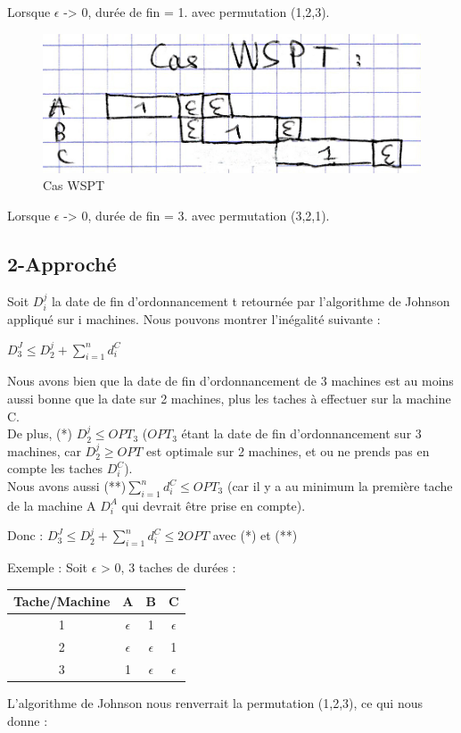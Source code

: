 \documentclass[12pt]{article}
\begin{document}
Lorsque $\epsilon$ -> 0, durée de fin = 1. avec permutation (1,2,3).

\begin{figure}[!ht]
\centering
\centerline{\includegraphics[scale=1]{2.jpg}}
\caption{Cas WSPT}
\label{wspt1}
\end{figure}

Lorsque $\epsilon$ -> 0, durée de fin = 3. avec permutation (3,2,1).

\subsection{2-Approché}

Soit $D_i^j$ la date de fin d'ordonnancement t retournée par l'algorithme de Johnson appliqué sur i machines.
Nous pouvons montrer l'inégalité suivante : \\
\begin{center}
$D_3^J \le D_2^j + \displaystyle\sum_{i=1}^n d_i^C$\\
\end{center}
Nous avons bien que la date de fin d'ordonnancement de 3 machines est au moins aussi bonne que la date sur 2 machines, plus les taches à effectuer sur la machine C.\\

De plus, (*) $D_2^j \le OPT_3$ ($OPT_3$ étant la date de fin d'ordonnancement sur 3 machines, car $D_2^j \ge OPT$ est optimale sur 2 machines, et ou ne prends pas en compte les taches $D_i^C$).\\

Nous avons aussi (**)$\displaystyle\sum_{i=1}^n d_i^C \le OPT_3$ (car il y a au minimum la première tache de la machine A $D_i^A$ qui devrait être prise en compte).\\
\begin{center}
Donc :
$D_3^J \le D_2^j + \displaystyle\sum_{i=1}^n d_i^C \le 2OPT$ avec (*) et (**)
\end{center}
Exemple : Soit $\epsilon$ > 0, 3 taches de durées :\\
\begin{center}
\begin{tabular}{|c|c|c|c|}

\hline 
Tache/Machine & A & B & C \\ 
\hline 
1 & $\epsilon$ & 1 & $\epsilon$ \\ 
\hline 
2 & $\epsilon$ & $\epsilon$ & 1 \\ 
\hline 
3 & 1 & $\epsilon$ & $\epsilon$ \\ 
\hline 
\end{tabular} 
\end{center}
L'algorithme de Johnson nous renverrait la permutation (1,2,3), ce qui nous donne :
\end{document}
